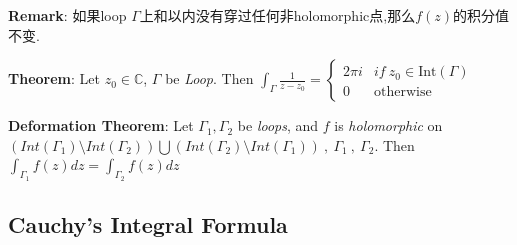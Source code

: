 \documentclass[9pt]{article}
\begin{document}
\quad \textbf{Remark}: {\small 如果loop $\Gamma$上和以内没有穿过任何非holomorphic点,那么$f(z)$的积分值不变.}

\textbf{Theorem}: Let $z_0\in\mathbb{C}$, $\Gamma$ be \textit{Loop}. Then $\int_\Gamma \frac{1}{z-z_0}=\begin{cases}2\pi i & if \ z_0\in\text{Int}(\Gamma) \\ 0 & \text{otherwise} \end{cases}$

\textbf{Deformation Theorem}: {\footnotesize Let $\Gamma_1,\Gamma_2$ be \textit{loops}, and $f$ is \textit{holomorphic} on $\left(Int(\Gamma_1)\setminus Int(\Gamma_2)\right)\bigcup\left(Int(\Gamma_2)\setminus Int(\Gamma_1)\right) \ , \ \Gamma_1 \ , \ \Gamma_2$. Then $\int_{\Gamma_1}f(z)dz=\int_{\Gamma_2}f(z)dz$}

 


\subsection{Cauchy's Integral Formula} %
\end{document}
